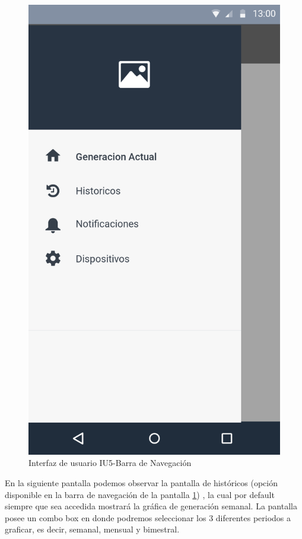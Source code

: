 \begin{figure}[H]
	\centering
	\includegraphics[scale=0.70]{Capitulo4/software/submodulos/images/navegacion.png}
	\caption{Interfaz de usuario IU5-Barra de Navegación}
	\label{fig:Barra de navegacion}
\end{figure}

En la siguiente pantalla podemos observar la pantalla de históricos (opción disponible en la barra de navegación de la pantalla \ref{fig:Barra de navegacion}) , la cual por default siempre que sea accedida mostrará la gráfica de generación semanal. La pantalla posee un combo box en donde podremos seleccionar los 3 diferentes periodos a graficar, es decir, semanal, mensual y bimestral.


